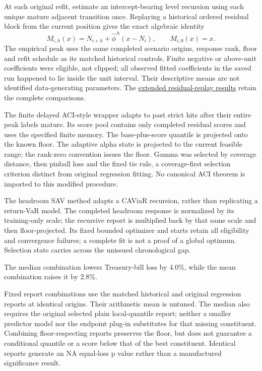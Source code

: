 \documentclass[12pt,a4paper]{article}
\begin{document}
At each original refit, estimate an intercept-bearing level recursion
using each unique mature adjacent transition once. Replaying a historical ordered
residual block from the current position gives the exact algebraic identity
\[
M_{i,h}(x)=N_{i+h}+\widehat\phi^{\,h}(x-N_i),\qquad M_{i,0}(x)=x.
\]
The empirical peak uses the same completed scenario origins, response rank,
floor and refit schedule as its matched historical controls. Finite negative or
above-unit coefficients were eligible, not clipped; all observed fitted
coefficients in the saved run happened to lie inside the unit interval.
Their descriptive means are not identified data-generating parameters.
The \href{https://github.com/ByronLi0207/financial-mathematics-paper-20261020/blob/submission-final/EXTENDED_RESULTS.md#asmbi-extended-s07}{extended residual-replay results} retain the complete comparisons.

The finite delayed ACI-style wrapper adapts to past strict hits after their entire peak labels mature. Its score pool contains only completed residual
scores and uses the specified finite memory. The base-plus-score quantile is
projected onto the known floor. The adaptive alpha state is projected to the
current feasible range; the rank-zero convention issues the floor. Gamma was
selected by coverage distance, then pinball loss and the fixed tie rule, a
coverage-first selection criterion distinct from original regression fitting.
No canonical ACI theorem is imported to this modified procedure.

The headroom SAV method adapts a CAViaR recursion, rather than replicating a
return-VaR model. The completed headroom response is normalized by its
training-only scale; the recursive report is multiplied back by that same
scale and then floor-projected. Its fixed bounded optimizer and starts retain
all eligibility and convergence failures; a complete fit is not a proof of a
global optimum. Selection state carries across the unissued chronological gap.

The median combination lowers Treasury-bill loss by 4.0\%, while the mean combination raises it by 2.8\%.

Fixed report combinations use the matched historical and original
regression reports at identical origins. Their arithmetic mean is untuned.
The median also requires the original selected plain local-quantile report;
neither a smaller predictor model nor the endpoint plug-in substitutes for
that missing constituent. Combining floor-respecting reports preserves the floor, but does not guarantee a conditional quantile or a score below that of the best constituent. Identical reports generate an NA equal-loss p value rather
than a manufactured significance result.
\end{document}
